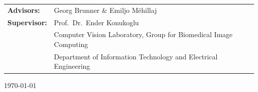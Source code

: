 \begin{titlepage}
\begin{center}
    \end{center}


    \vfill
    \begin{center}
        \begin{tabular}{ll}
            \Large{\textbf{Advisors:}}   & \Large{Georg Brunner \& Emiljo Mëhillaj}                                 \\
            \Large{\textbf{Supervisor:}} & \Large{Prof.~Dr.~Ender Konukoglu}                                        \\
                                         & \small{Computer Vision Laboratory, Group for Biomedical Image Computing} \\
                                         & \small{Department of Information Technology and Electrical Engineering}  \\
        \end{tabular}
    \end{center}

    \begin{center}
        \today
    \end{center}


\end{titlepage}

